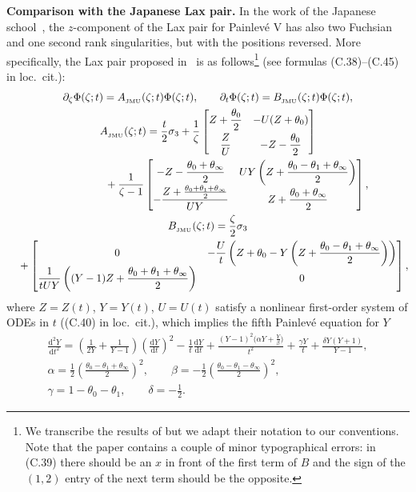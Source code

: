 \documentclass[10pt,a4paper]{amsart}
\numberwithin{equation}{section}
\theoremstyle{definition}
\def\le{\left}
\def\ri{\right}
\def \d{{\mathrm d}}
\def\nn{\nonumber}
\def\s{\sigma}
\def\pa{\partial}
\begin{document}
{\bf Comparison with the Japanese Lax pair.}
In the work of the Japanese school~\cite{JMU2}, the $z$-component of the Lax pair for Painlev\'e V has also two Fuchsian and one second rank singularities, but with the positions reversed.
More specifically, the Lax pair proposed in~\cite{JMU2} is as follows\footnote{We transcribe the results of \cite{JMU2} but we adapt their notation to our conventions. Note that the paper contains a couple of minor typographical errors: in (C.39) there should be an $x$ in front of the first term of $B$ and the sign of the $(1,2)$ entry of the next term should be the opposite.} (see formulas (C.38)--(C.45) in loc.\ cit.):
 \begin{gather}%
\pa_\zeta \Phi(\zeta;t) = A_{_{\rm JMU}}(\zeta;t) \Phi(\zeta;t),\qquad
\pa_t \Phi(\zeta;t) = B_{_{\rm JMU}}(\zeta;t) \Phi(\zeta;t),
\nn
\\
 A_{_{\rm JMU}}(\zeta;t) = \frac t 2 \s_3 + \frac 1 \zeta \begin{bmatrix}
 \displaystyle Z + \frac {\theta_0}2 & -U(Z+\theta_0)\vspace{1mm}\\
 \displaystyle \frac Z U & \displaystyle -Z - \frac {\theta_0}2
 \end{bmatrix}\nn\\
 \phantom{ A_{_{\rm JMU}}(\zeta;t) = }{}
 +\frac 1{\zeta-1}\begin{bmatrix}
 \displaystyle-Z-\frac {\theta_0 + \theta_\infty}2 &
\displaystyle UY\left(Z+ \frac {\theta_0-\theta_1+ \theta_\infty}2\right) \\
\displaystyle-\frac{Z+\frac {\theta_0 + \theta_1 + \theta_\infty}2}{UY} &
\displaystyle Z+\frac {\theta_0 + \theta_\infty}2
 \end{bmatrix},
\nn
\\
 B_{_{\rm JMU}}(\zeta;t) = \frac \zeta 2 \s_3 \label{LaxJMU}\\
 \quad{}+ \begin{bmatrix}
 0
 &
 \displaystyle -\frac {U}t\left( Z +\theta_0 - Y\left(Z + \frac {\theta_0 - \theta_1 + \theta_\infty}2\right)\right)\\
 \displaystyle \frac 1{t U Y} \left(( Y -1) Z + \frac {\theta_0 + \theta_1 +\theta_\infty}2\right)
 & 0
 \end{bmatrix},\nn
 \end{gather}
 where $Z = Z(t)$, $ Y = Y(t)$, $ U=U(t)$ satisfy a nonlinear first-order system of ODEs in $t$ ((C.40) in loc.\ cit.), which implies the fifth Painlev\'e equation for $Y$
 \begin{gather}
\frac {\d^2 Y}{\d t^2 } = \le(\frac 1{2Y} + \frac 1{Y-1} \ri) \le(\frac {\d Y}{\d t}\ri)^2 - \frac 1 t \frac {\d Y}{\d t} + \frac {(Y-1)^2\bigl(\alpha Y+\frac Y \beta\bigr)}{t^2} + \frac {\gamma Y}t + \frac {\delta Y(Y+1)}{Y-1},\nn
\\
\alpha = \frac 1 2 \le(\frac {\theta_0 - \theta_1 + \theta_\infty }2\ri)^2,\qquad
\beta = -\frac 1 2 \le(\frac {\theta_0 - \theta_1 - \theta_\infty }2\ri)^2,\nn\\
\gamma = 1 -\theta_0 - \theta_1,\qquad \delta = -\frac 1 2. \label{PV}
 \end{gather}
\end{document}
